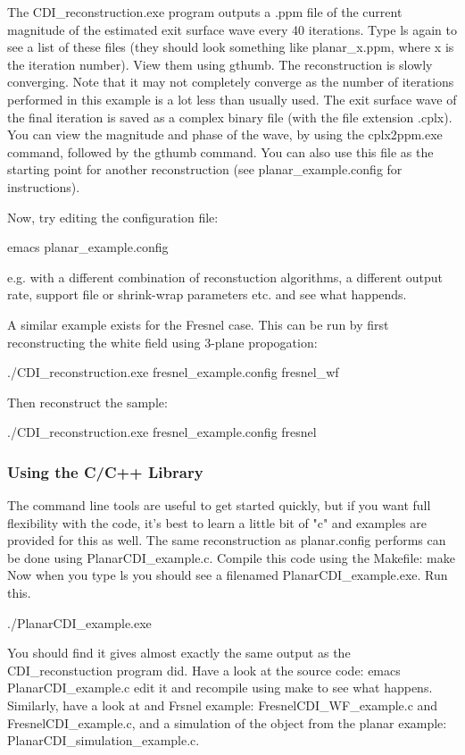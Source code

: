 \documentclass[]{cxs-software}
\begin{document}
The CDI\_reconstruction.exe program outputs a .ppm file of the current
magnitude of the estimated exit surface wave every 40 iterations. Type
ls again to see a list of these files (they should look something like
planar\_x.ppm, where x is the iteration number). View them using
gthumb. The reconstruction is slowly converging. Note that it may not
completely converge as the number of iterations performed in this
example is a lot less than usually used. The exit surface wave of the
final iteration is saved as a complex binary file (with the file
extension .cplx). You can view the magnitude and phase of the wave, by
using the cplx2ppm.exe command, followed by the gthumb command. You
can also use this file as the starting point for another
reconstruction (see planar\_example.config for instructions).

Now, try editing the configuration file: 
\begin{myverbatim}
   emacs planar_example.config 
\end{myverbatim}
e.g. with a different combination of reconstuction algorithms, a
different output rate, support file or shrink-wrap parameters etc. and
see what happends.

A similar example exists for the Fresnel case. This can be run by
first reconstructing the white field using 3-plane propogation:
\begin{myverbatim}
   ./CDI_reconstruction.exe fresnel_example.config fresnel_wf 
\end{myverbatim}
Then reconstruct the sample: 
\begin{myverbatim}
   ./CDI_reconstruction.exe fresnel_example.config fresnel
\end{myverbatim}

\subsubsection{Using the C/C++ Library}

The command line tools are useful to get started quickly, but if you
want full flexibility with the code, it's best to learn a little bit
of "c" and examples are provided for this as well. The same
reconstruction as planar.config performs can be done using
PlanarCDI\_example.c. Compile this code using the Makefile: make Now
when you type ls you should see a filenamed PlanarCDI\_example.exe. Run
this.
\begin{myverbatim}
./PlanarCDI_example.exe 
\end{myverbatim}
You should find it gives almost exactly the same output as the
CDI\_reconstuction program did. Have a look at the source code: emacs
PlanarCDI\_example.c edit it and recompile using make to see what
happens. Similarly, have a look at and Frsnel example:
FresnelCDI\_WF\_example.c and FresnelCDI\_example.c, and a simulation of
the object from the planar example: PlanarCDI\_simulation\_example.c.
\end{document}
